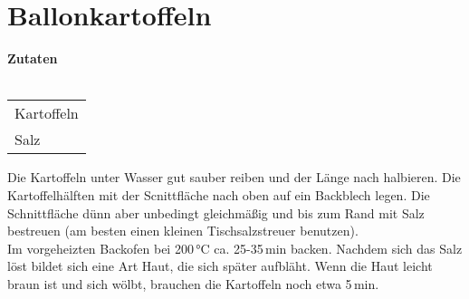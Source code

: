 \section*{Ballonkartoffeln}
\vspace{2cm}
\begingroup
	\parfillskip=0pt
\begin{minipage}[t][][t]{0.33\linewidth}
{{\large \textbf{Zutaten}}}\\\\
\begin{tabular}{l}
Kartoffeln\\
Salz\\
\end{tabular}
\end{minipage}
\hfill
\begin{minipage}[t][][t]{0.66\linewidth}
Die Kartoffeln unter Wasser gut sauber reiben und der Länge nach halbieren. Die Kartoffelhälften mit der Scnittfläche nach oben auf ein Backblech legen. Die Schnittfläche dünn aber unbedingt gleichmäßig und bis zum Rand mit Salz bestreuen (am besten einen kleinen Tischsalzstreuer benutzen).\\Im vorgeheizten Backofen bei 200\,°C ca. 25-35\,min backen. Nachdem sich das Salz löst bildet sich eine Art Haut, die sich später aufbläht. Wenn die Haut leicht braun ist und sich wölbt, brauchen die Kartoffeln noch etwa 5\,min.
\end{minipage}

\clearpage